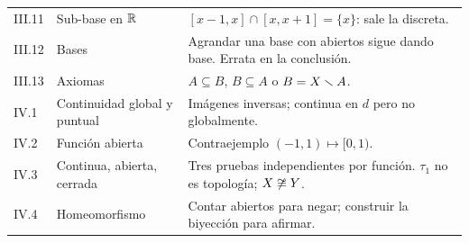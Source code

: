 \begin{center}
\begin{longtable}{@{}p{2.3cm}p{4.3cm}p{8.8cm}@{}}
III.11 & Sub-base en $\mathbb{R}$ & $[x-1,x]\cap[x,x+1]=\{x\}$: sale la discreta.\\
III.12 & Bases & Agrandar una base con abiertos sigue dando base. Errata en la conclusión.\\
III.13 & Axiomas & $A\subseteq B$, $B\subseteq A$ o $B=X\smallsetminus A$.\\
IV.1 & Continuidad global y puntual & Imágenes inversas; continua en $d$ pero no globalmente.\\
IV.2 & Función abierta & Contraejemplo $(-1,1)\mapsto[0,1)$.\\
IV.3 & Continua, abierta, cerrada & Tres pruebas independientes por función. $\tau_1$ no es topología; $X\not\cong Y$.\\
IV.4 & Homeomorfismo & Contar abiertos para negar; construir la biyección para afirmar.\\ \bottomrule
\end{longtable}
\end{center}

